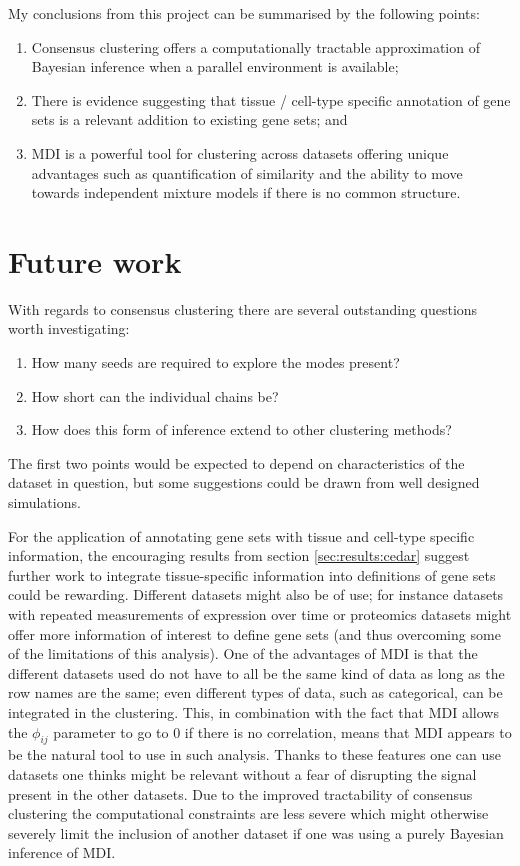 \documentclass[14pt]{extarticle} %
\begin{document}
	My conclusions from this project can be summarised by the following points:
	\begin{enumerate}
		\item Consensus clustering offers a computationally tractable approximation of Bayesian inference when a parallel environment is available; 
		\item There is evidence suggesting that tissue / cell-type specific annotation of gene sets is a relevant addition to existing gene sets; and
		\item MDI is a powerful tool for clustering across datasets offering unique advantages such as quantification of similarity and the ability to move towards independent mixture models if there is no common structure.
	\end{enumerate} 
	
	\section{Future work}
	With regards to consensus clustering there are several outstanding questions worth investigating:
	\begin{enumerate}
		\item How many seeds are required to explore the modes present?
		\item How short can the individual chains be?
		\item How does this form of inference extend to other clustering methods?
	\end{enumerate}
	The first two points would be expected to depend on characteristics of the dataset in question, but some suggestions could be drawn from well designed simulations.
	
	For the application of annotating gene sets with tissue and cell-type specific information, the encouraging results from section \ref{sec:results:cedar} suggest further work to integrate tissue-specific information into definitions of gene sets could be rewarding. Different datasets might also be of use; for instance datasets with repeated measurements of expression over time or proteomics datasets might offer more information of interest to define gene sets (and thus overcoming some of the limitations of this analysis). One of the advantages of MDI is that the different datasets used do not have to all be the same kind of data as long as the row names are the same; even different types of data, such as categorical, can be integrated in the clustering. This, in combination with the fact that MDI allows the $\phi_{ij}$ parameter to go to 0 if there is no correlation, means that MDI appears to be the natural tool to use in such analysis. Thanks to these features one can use datasets one thinks might be relevant without a fear of disrupting the signal present in the other datasets. Due to the improved tractability of consensus clustering the computational constraints are less severe which might otherwise severely limit the inclusion of another dataset if one was using a purely Bayesian inference of MDI.
	
\end{document}
